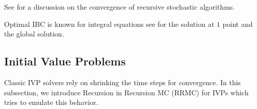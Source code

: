 \documentclass[a4paper,12pt]{article}
\begin{document}
\begin{related}
    See \cite{gupta_convergence_2021} for a discussion on the convergence
    of recursive stochastic algorithms.
\end{related}


\begin{related}
    Optimal IBC is known for integral equations see \cite{heinrich_monte_1998}
    for the solution at $1$ point and the global solution.
\end{related}

\subsection{Initial Value Problems}
Classic IVP solvers rely on shrinking the time steps for
convergence. In this subsection, we introduce
Recursion in Recursion MC (RRMC) for IVPs which tries to emulate
this behavior.
\end{document}
